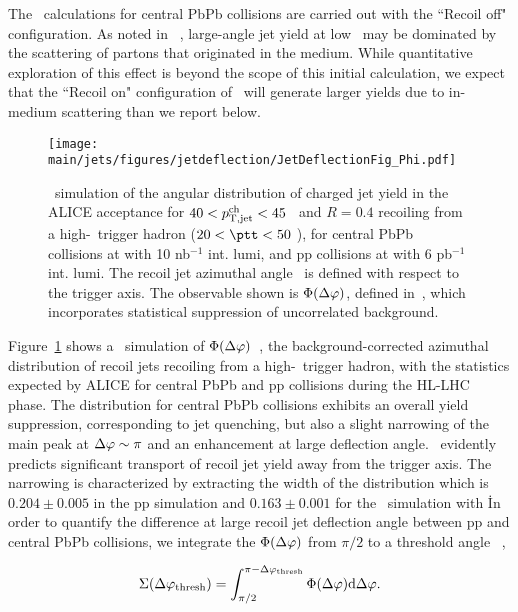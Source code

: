 The \jewel\ calculations for central PbPb collisions are carried out with the ``Recoil off" configuration. As noted in ~\cite{DEramo:2018eoy}, large-angle jet yield at low \ptjet\ may be dominated by the scattering of partons that originated in the medium. While quantitative exploration of this effect is beyond the scope of this initial calculation, we expect that the ``Recoil on" configuration of \jewel\ will generate larger yields due to in-medium scattering than we report below.

\begin{figure}[tbh!]
\centering
\texttt{[image: \\main/jets/figures/jetdeflection/JetDeflectionFig\_Phi.pdf]}
\caption{\jewel\ simulation of the angular distribution of charged jet yield in the ALICE acceptance for  $40<p_{\mathrm{T,jet}}^{\mathrm{ch}}<45$ \gevc\ and $R=0.4$ recoiling from a high-\pt\ trigger hadron ($20<\ptt<50$ \gevc), for central PbPb collisions at  with 10 nb$^{-1}$ int. lumi, and pp collisions at  with 6 pb$^{-1}$ int. lumi. The recoil jet azimuthal angle \Dphi\ is defined with respect to the trigger axis. The observable shown is $\Phi(\Delta\varphi)$, defined in~\cite{Adam:2015doa}, which incorporates statistical suppression of uncorrelated background.
}
\label{fig:JetDeflectionPhi}
\end{figure}

Figure~\ref{fig:JetDeflectionPhi} shows a \jewel\ simulation of $\Phi(\Delta\varphi)$~\cite{Adam:2015doa}, the background-corrected azimuthal distribution of recoil jets recoiling from a high-\pT\ trigger hadron, with the statistics expected by ALICE for central PbPb and pp collisions during the HL-LHC phase. The distribution for central PbPb collisions exhibits an overall yield suppression, corresponding to jet quenching, but also a slight narrowing of the main peak at $\Delta\varphi\sim\pi$ and an enhancement at large deflection angle. \jewel\ evidently predicts significant transport of recoil jet yield away from the trigger axis. The narrowing is characterized by extracting the width of the distribution which is $0.204 \pm 0.005$ in the pp simulation and $0.163 \pm 0.001$ for the \PbPb\ simulation with \jewel\. 
In order to quantify the difference at large recoil jet deflection angle between pp and central PbPb collisions, we integrate the $\Phi(\Delta\varphi)$ from $\pi/2$ to a threshold angle \dphithresh~\cite{Adam:2015doa},

\begin{equation}
\Sigma(\Delta\varphi_{\mathrm{thresh}}) = 
\int_{\pi/2}^{\pi-\Delta\varphi_{\mathrm{thresh}}}
\Phi(\Delta\varphi)\mathrm{d}\Delta\varphi.
\label{eq:Sigma}
\end{equation}

